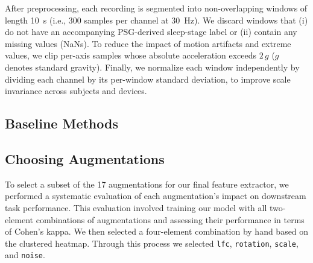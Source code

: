\documentclass[journal,twoside,web]{ieeecolor}
\begin{document}
After preprocessing, each recording is segmented into non-overlapping windows of length 10~s (i.e., 300 samples per channel at 30~Hz). We discard windows that (i) do not have an accompanying PSG-derived sleep-stage label or (ii) contain any missing values (NaNs). To reduce the impact of motion artifacts and extreme values, we clip per-axis samples whose absolute acceleration exceeds $2\,g$ ($g$ denotes standard gravity). Finally, we normalize each window independently by dividing each channel by its per-window standard deviation, to improve scale invariance across subjects and devices.

\subsection{Baseline Methods}

\subsection{Choosing Augmentations}
To select a subset of the 17 augmentations for our final feature extractor, we performed a systematic evaluation of each augmentation's impact on downstream task performance. This evaluation involved training our model with all two-element combinations of augmentations and assessing their performance in terms of Cohen's kappa. We then selected a four-element combination by hand based on the clustered heatmap.
Through this process we selected \texttt{lfc}, \texttt{rotation}, \texttt{scale}, and \texttt{noise}.
\end{document}
